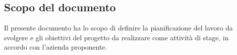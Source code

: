 \subsection{Scopo del documento}
Il presente documento ha lo scopo di definire la pianificazione del lavoro da svolgere e gli obiettivi del progetto da realizzare come attività di stage, in accordo con l'azienda proponente.
